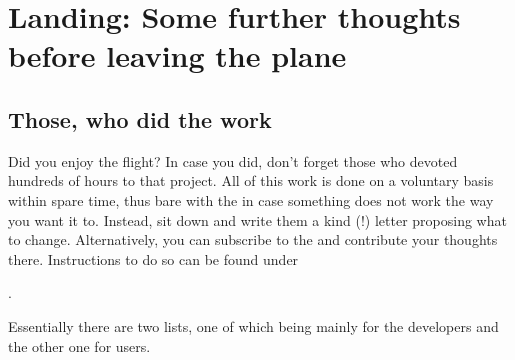 
\chapter{Landing: Some further thoughts before leaving the plane\label{landing}}


\section{Those, who did the work}

Did you enjoy the flight? In case you did, don't forget those who devoted hundreds of
hours to that project. All of this work is done on a voluntary basis within spare time,
thus bare with the  in case something does not work the way you want
it to. Instead, sit down and write them a kind (!) letter proposing what to change.
Alternatively, you can subscribe to the \FlightGear {} and contribute
your thoughts there. Instructions to do so can be found under

 .

Essentially there are two lists, one of which being mainly for the developers and the
other one for users.

